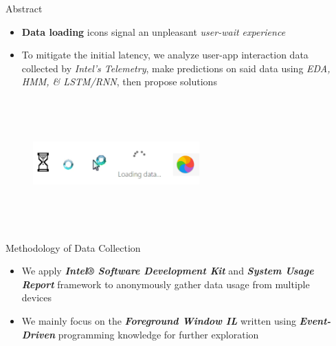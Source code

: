 \documentclass[final]{beamer}
\newlength{\sepwidth}
\newlength{\colwidth}
\newcommand{\separatorcolumn}{\begin{column}{\sepwidth}\end{column}}
\begin{document}
\begin{frame}[t]
  \begin{columns}[t]
    \separatorcolumn

    \begin{column}{\colwidth}

      \begin{block}{\huge{Abstract}}

        {
          \fontsize{37pt}{44.4pt} \selectfont 
          \begin{itemize}
            \item \textbf{Data loading} icons signal an unpleasant \textit{user-wait experience}
            \item To mitigate the initial latency, we analyze user-app interaction data collected by \textit{Intel's Telemetry},
            make predictions on said data using \textit{EDA, HMM, \& LSTM/RNN}, then propose solutions
        \end{itemize}
        }
        \begin{figure}\includegraphics[width=0.6\textwidth, height=5cm]{user-wait.jpeg}\end{figure}

      \end{block}

      \begin{alertblock}{\huge{Methodology of Data Collection}}

        {
          \fontsize{37pt}{44.4pt} \selectfont 
          \begin{itemize}
            \item We apply \textbf{\textit{Intel® Software Development Kit}} and \textbf{\textit{System Usage Report}} framework to anonymously gather data usage from multiple devices
            \item We mainly focus on the \textbf{\textit{Foreground Window IL}} written using \textbf{\textit{Event-Driven}} programming knowledge for further exploration 
          \end{itemize}
        }
        

\end{alertblock}
\end{column}
\end{columns}
\end{frame}
\end{document}
